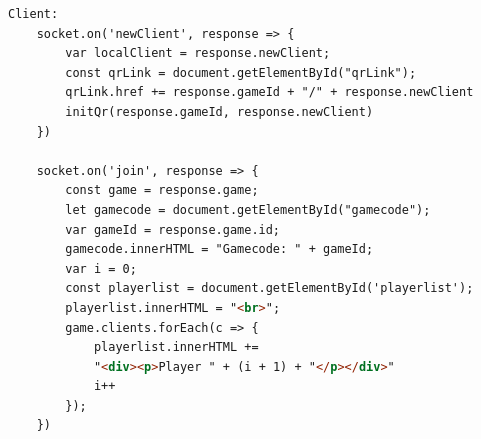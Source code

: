 \begin{lstlisting}[language=html,caption=Join Game]
    Client:
    socket.on('newClient', response => {
        var localClient = response.newClient;
        const qrLink = document.getElementById("qrLink");
        qrLink.href += response.gameId + "/" + response.newClient
        initQr(response.gameId, response.newClient)
    })

    socket.on('join', response => {
        const game = response.game;
        let gamecode = document.getElementById("gamecode");
        var gameId = response.game.id;
        gamecode.innerHTML = "Gamecode: " + gameId;
        var i = 0;
        const playerlist = document.getElementById('playerlist');
        playerlist.innerHTML = "<br>";
        game.clients.forEach(c => {
            playerlist.innerHTML +=
            "<div><p>Player " + (i + 1) + "</p></div>"
            i++
        });
    })
\end{lstlisting}

